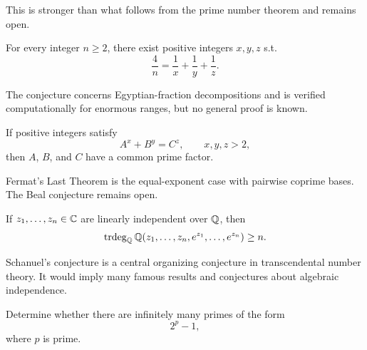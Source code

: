     \begin{remark}
        This is stronger than what follows from the prime number theorem and
        remains open.
    \end{remark}

    \begin{conjecture}
        For every integer $n\geq 2$, there exist positive integers $x,y,z$ s.t.
        \[
            \frac{4}{n}
            =
            \frac{1}{x}+\frac{1}{y}+\frac{1}{z}.
        \]
    \end{conjecture}

    \begin{remark}
        The conjecture concerns Egyptian-fraction decompositions and is verified
        computationally for enormous ranges, but no general proof is known.
    \end{remark}

    \begin{conjecture}
        If positive integers satisfy
        \[
            A^x+B^y=C^z,
            \qquad
            x,y,z>2,
        \]
        then $A$, $B$, and $C$ have a common prime factor.
    \end{conjecture}

    \begin{remark}
        Fermat's Last Theorem is the equal-exponent case with pairwise coprime
        bases. The Beal conjecture remains open.
    \end{remark}

    \begin{conjecture}
        If $z_1,\dots,z_n\in\mathbb{C}$ are linearly independent over $\mathbb{Q}$, then
        \[
            \operatorname{trdeg}_{\mathbb{Q}}
            \mathbb{Q}(z_1,\dots,z_n,e^{z_1},\dots,e^{z_n})
            \geq n.
        \]
    \end{conjecture}

    \begin{remark}
        Schanuel's conjecture is a central organizing conjecture in
        transcendental number theory. It would imply many famous results and
        conjectures about algebraic independence.
    \end{remark}

    \begin{openproblem}
        Determine whether there are infinitely many primes of the form
        \[
            2^p-1,
        \]
        where $p$ is prime.
    \end{openproblem}

